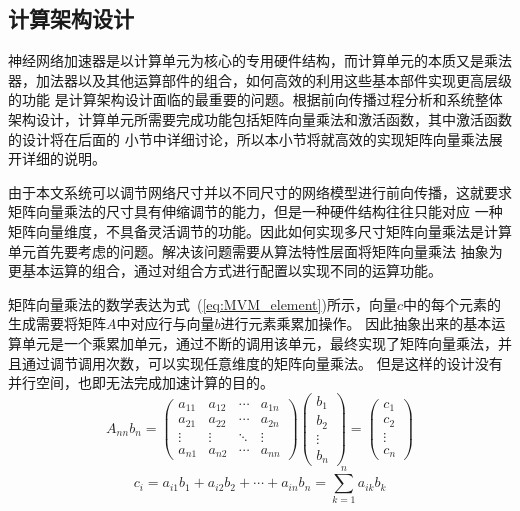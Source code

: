 \subsection{计算架构设计}
神经网络加速器是以计算单元为核心的专用硬件结构，而计算单元的本质又是乘法器，加法器以及其他运算部件的组合，如何高效的利用这些基本部件实现更高层级的功能
是计算架构设计面临的最重要的问题。根据前向传播过程分析和系统整体架构设计，计算单元所需要完成功能包括矩阵向量乘法和激活函数，其中激活函数的设计将在后面的
小节中详细讨论，所以本小节将就高效的实现矩阵向量乘法展开详细的说明。

由于本文系统可以调节网络尺寸并以不同尺寸的网络模型进行前向传播，这就要求矩阵向量乘法的尺寸具有伸缩调节的能力，但是一种硬件结构往往只能对应
一种矩阵向量维度，不具备灵活调节的功能。因此如何实现多尺寸矩阵向量乘法是计算单元首先要考虑的问题。解决该问题需要从算法特性层面将矩阵向量乘法
抽象为更基本运算的组合，通过对组合方式进行配置以实现不同的运算功能。

矩阵向量乘法的数学表达为式~(\ref{eq:MVM_element})所示，向量\(c\)中的每个元素的生成需要将矩阵\(A\)中对应行与向量\(b\)进行元素乘累加操作。
因此抽象出来的基本运算单元是一个乘累加单元，通过不断的调用该单元，最终实现了矩阵向量乘法，并且通过调节调用次数，可以实现任意维度的矩阵向量乘法。
但是这样的设计没有并行空间，也即无法完成加速计算的目的。
\begin{equation}
	A_{nn}b_n = 
	\begin{pmatrix}
		a_{11} & a_{12} & \cdots & a_{1n} \\
  		a_{21} & a_{22} & \cdots & a_{2n} \\
  		\vdots  & \vdots  & \ddots & \vdots  \\
  		a_{n1} & a_{n2} & \cdots & a_{nn} 
 \end{pmatrix}
	\begin{pmatrix}
        b_{1}	\\ 
        b_{2}	\\
		\vdots	\\ 
        b_{n} 
	\end{pmatrix}
  =
	\begin{pmatrix}
        c_{1}	\\ 
        c_{2}	\\
		\vdots	\\ 
        c_{n}  
     \end{pmatrix}
\label{eq:MVM_element}
\end{equation}
$$c_{i}= a_{i1} b_{1} + a_{i2} b_{2} +\cdots+ a_{in}b_{n} = \sum_{k=1}^n a_{ik}b_{k}$$

